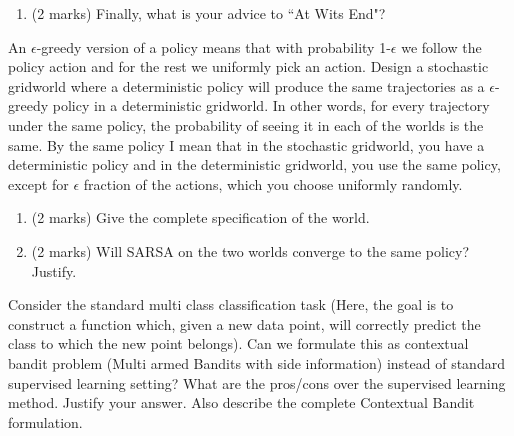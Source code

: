 \documentclass[addpoints,12pt,solution]{exam}
\begin{document}
\begin{questions}
\begin{enumerate}[label=(\alph*)]
            \item (2 marks) Finally, what is your advice to ``At Wits End"?

            \begin{solution}


            \end{solution}


        \end{enumerate}

         An $\epsilon$-greedy version of a policy means that with probability 1-$\epsilon$ we follow the policy action and for the rest we uniformly pick an action.
        Design a stochastic gridworld where a deterministic policy will produce
        the same trajectories as a $\epsilon$-greedy policy in a deterministic
        gridworld. In other words, for every trajectory under the same policy, the
        probability of seeing it in each of the worlds is the same. By the same policy I mean that in the stochastic gridworld, you have a deterministic policy and in the
        deterministic gridworld, you use the same policy, except for $\epsilon$ fraction of the actions, which you choose uniformly randomly.

        \begin{enumerate}[label=(\alph*)]

            \item (2 marks) Give the complete specification of the world.

            \begin{solution}


            \end{solution}


            \item (2 marks) Will SARSA on the two worlds converge to the same policy? Justify.

            \begin{solution}

            \end{solution}

        \end{enumerate}

         Consider the standard multi class classification task (Here, the goal is to construct a function which, given a new data point, will correctly predict the class to which the new point belongs). Can we formulate this as contextual bandit problem (Multi armed Bandits with side information) instead of standard supervised learning setting? What are the pros/cons over the supervised learning method. Justify your answer. Also describe the complete Contextual Bandit formulation.


\end{questions}
\end{document}
